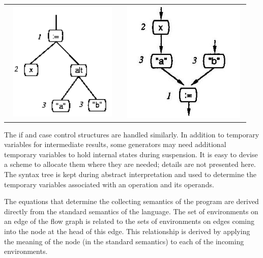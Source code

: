 \begin{flushleft}
\tablefirsthead{}
\tablehead{}
\tabletail{}
\tablelasttail{}
\begin{supertabular}{m{2.5in}m{3in}}
  \includegraphics[width=2.2492in,height=2.2398in]{kw/figure3-3.png}   &
  \includegraphics[width=2.4154in,height=2.3in]{kw/figure3-4.png}  \\
\end{supertabular}
\end{flushleft}

The if and case control structures are handled similarly. In addition
to temporary variables for intermediate results, some generators may
need additional temporary variables to hold internal states during
suspension. It is easy to devise a scheme to allocate them where they
are needed; details are not presented here. The syntax tree is kept
during abstract interpretation and used to determine the temporary
variables associated with an operation and its operands.

The equations that determine the collecting semantics of the program
are derived directly from the standard semantics of the language. The
set of environments on an edge of the flow graph is related to the
sets of environments on edges coming into the node at the head of this
edge. This relationship is derived by applying the meaning of the node
(in the standard semantics) to each of the incoming environments.

